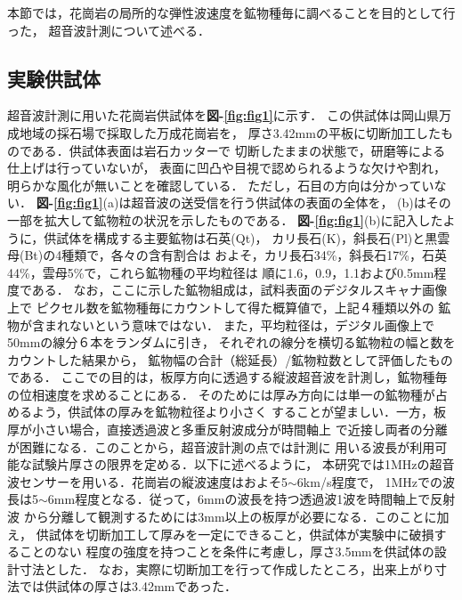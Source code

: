 ﻿%
本節では，花崗岩の局所的な弾性波速度を鉱物種毎に調べることを目的として行った，
超音波計測について述べる．
\subsection{実験供試体}
超音波計測に用いた花崗岩供試体を{\bf 図-\ref{fig:fig1}}に示す．
この供試体は岡山県万成地域の採石場で採取した万成花崗岩を，
厚さ3.42mmの平板に切断加工したものである．供試体表面は岩石カッターで
切断したままの状態で，研磨等による仕上げは行っていないが，
表面に凹凸や目視で認められるような欠けや割れ，明らかな風化が無いことを確認している．
ただし，石目の方向は分かっていない．
{\bf 図-\ref{fig:fig1}}(a)は超音波の送受信を行う供試体の表面の全体を，
(b)はその一部を拡大して鉱物粒の状況を示したものである．
 {\bf 図-\ref{fig:fig1}}(b)に記入したように，供試体を構成する主要鉱物は石英(Qt)，
カリ長石(K)，斜長石(Pl)と黒雲母(Bt)の4種類で，各々の含有割合は
およそ，カリ長石34\%，斜長石17\%，石英44\%，雲母5\%で，これら鉱物種の平均粒径は
順に1.6，0.9，1.1および0.5mm程度である．
なお，ここに示した鉱物組成は，試料表面のデジタルスキャナ画像上で
ピクセル数を鉱物種毎にカウントして得た概算値で，上記４種類以外の
鉱物が含まれないという意味ではない．
また，平均粒径は，デジタル画像上で50mmの線分６本をランダムに引き，
それぞれの線分を横切る鉱物粒の幅と数をカウントした結果から，
鉱物幅の合計（総延長）/鉱物粒数として評価したものである．
ここでの目的は，板厚方向に透過する縦波超音波を計測し，鉱物種毎の位相速度を求めることにある．
そのためには厚み方向には単一の鉱物種が占めるよう，供試体の厚みを鉱物粒径より小さく
することが望ましい．一方，板厚が小さい場合，直接透過波と多重反射波成分が時間軸上
で近接し両者の分離が困難になる．このことから，超音波計測の点では計測に
用いる波長が利用可能な試験片厚さの限界を定める．以下に述べるように，
本研究では1MHzの超音波センサーを用いる．花崗岩の縦波速度はおよそ5$\sim$6km/s程度で，
1MHzでの波長は5$\sim$6mm程度となる．従って，6mmの波長を持つ透過波1波を時間軸上で反射波
から分離して観測するためには3mm以上の板厚が必要になる．このことに加え，
供試体を切断加工して厚みを一定にできること，供試体が実験中に破損することのない
程度の強度を持つことを条件に考慮し，厚さ3.5mmを供試体の設計寸法とした．
なお，実際に切断加工を行って作成したところ，出来上がり寸法では供試体の厚さは3.42mmであった．
